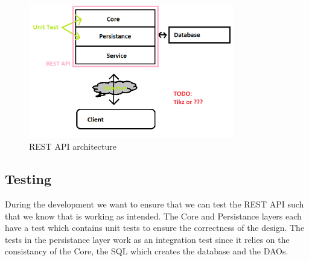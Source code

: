 \begin{figure}[h]
    \centering
    \includegraphics[width=0.8\textwidth]{figures/wip-stack.png}
    \caption{REST API architecture}
    \label{fig:rest-architecture}
\end{figure}

\subsection{Testing}
During the development we want to ensure that we can test the REST API such that we know that is working as intended. 
The Core and Persistance layers each have a test which contains unit tests to ensure the correctness of the design. 
The tests in the persistance layer work as an integration test since it relies on the consistancy of the Core, the SQL which creates the database and the DAOs.  


